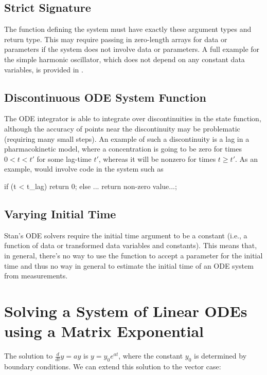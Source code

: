 \subsection{Strict Signature}

The function defining the system must have exactly these argument
types and return type.  This may require passing in zero-length arrays
for data or parameters if the system does not involve data or
parameters.  A full example for the simple harmonic oscillator, which
does not depend on any constant data variables, is provided in
.

\subsection{Discontinuous ODE System Function}

The ODE integrator is able to integrate over discontinuities in the
state function, although the accuracy of points near the discontinuity
may be problematic (requiring many small steps).  An example of such a
discontinuity is a lag in a pharmacokinetic model, where a
concentration is going to be zero for times $0 < t < t'$ for some
lag-time $t'$, whereas it will be nonzero for times $t \geq t'$.  As
an example, would involve code in the system such as
%
\begin{stancode}
if (t < t_lag)
  return 0;
else
  ... return non-zero value...;
\end{stancode}


\subsection{Varying Initial Time}

Stan's ODE solvers require the initial time argument to be a constant
(i.e., a function of data or transformed data variables and
constants).  This means that, in general, there's no way to use the
 function to accept a parameter for the initial
time and thus no way in general to estimate the initial time of an ODE
system from measurements.

\section{Solving a System of Linear ODEs using a Matrix Exponential}

The solution to $\frac{d}{dt} y = ay$ is $y = y_0e^{at}$, where the constant
$y_0$ is determined by boundary conditions. We can extend this solution
to the vector case:

